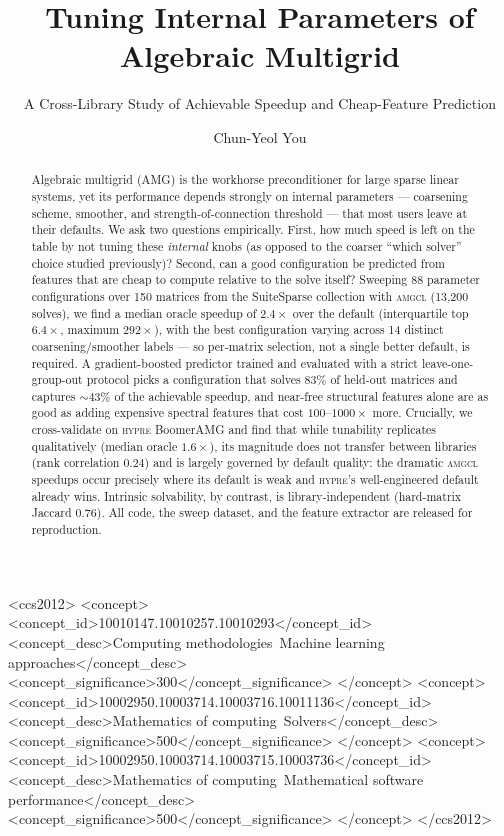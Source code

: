 \documentclass[acmsmall,screen,review]{acmart}
\newcommand{\amgcl}{\textsc{amgcl}}
\newcommand{\hypre}{\textsc{hypre}}
\begin{document}
\title{Tuning Internal Parameters of Algebraic Multigrid}
\subtitle{A Cross-Library Study of Achievable Speedup and Cheap-Feature
Prediction}

\author{Chun-Yeol You}

\renewcommand{\shortauthors}{C.-Y. You}

\begin{abstract}
Algebraic multigrid (AMG) is the workhorse preconditioner for large sparse
linear systems, yet its performance depends strongly on internal parameters
--- coarsening scheme, smoother, and strength-of-connection threshold --- that
most users leave at their defaults. We ask two questions empirically. First,
how much speed is left on the table by not tuning these \emph{internal} knobs
(as opposed to the coarser ``which solver'' choice studied previously)? Second,
can a good configuration be predicted from features that are cheap to compute
relative to the solve itself? Sweeping 88 parameter configurations over 150
matrices from the SuiteSparse collection with \amgcl{} (13{,}200 solves), we
find a median oracle speedup of $2.4\times$ over the default (interquartile top
$6.4\times$, maximum $292\times$), with the best configuration varying across
14 distinct coarsening/smoother labels --- so per-matrix selection, not a
single better default, is required. A gradient-boosted predictor trained and
evaluated with a strict leave-one-group-out protocol picks a configuration that
solves $83\%$ of held-out matrices and captures $\sim\!43\%$ of the achievable
speedup, and near-free structural features alone are as good as adding
expensive spectral features that cost $100$--$1000\times$ more. Crucially, we
cross-validate on \hypre{} BoomerAMG and find that while tunability replicates
qualitatively (median oracle $1.6\times$), its magnitude does not transfer
between libraries (rank correlation $0.24$) and is largely governed by default
quality: the dramatic \amgcl{} speedups occur precisely where its default is
weak and \hypre{}'s well-engineered default already wins. Intrinsic solvability,
by contrast, is library-independent (hard-matrix Jaccard $0.76$). All code, the
sweep dataset, and the feature extractor are released for reproduction.
\end{abstract}

\begin{CCSXML}
<ccs2012>
<concept>
<concept_id>10010147.10010257.10010293</concept_id>
<concept_desc>Computing methodologies~Machine learning approaches</concept_desc>
<concept_significance>300</concept_significance>
</concept>
<concept>
<concept_id>10002950.10003714.10003716.10011136</concept_id>
<concept_desc>Mathematics of computing~Solvers</concept_desc>
<concept_significance>500</concept_significance>
</concept>
<concept>
<concept_id>10002950.10003714.10003715.10003736</concept_id>
<concept_desc>Mathematics of computing~Mathematical software performance</concept_desc>
<concept_significance>500</concept_significance>
</concept>
</ccs2012>
\end{CCSXML}
\end{document}
